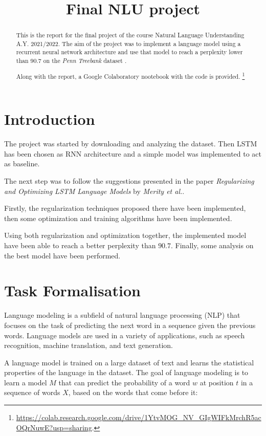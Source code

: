 \documentclass[a4paper]{article}
\title{Final NLU project}
\begin{document}
\maketitle

\begin{abstract}
This is the report for the final project of the course Natural Language Understanding A.Y. 2021/2022. The aim of the project
was to implement a language model using a recurrent neural network architecture and use that model to reach a perplexity lower 
than $90.7$ on the \textit{Penn Treebank} dataset \cite{PTB}.

Along with the report, a Google Colaboratory nootebook with the code is provided. \footnote{\url{https://colab.research.google.com/drive/1YtvMOG_NV_GIgWIFkMrchR5acOQrNuwE?usp=sharing}.}\\
\end{abstract}

\section{Introduction}
The project was started by downloading and analyzing the dataset. Then LSTM has been chosen as RNN architecture and
a simple model was implemented to act as baseline. 

The next step was to follow the suggestions presented in the paper \textit{Regularizing and Optimizing LSTM Language Models} \cite{Merity} 
by \textit{Merity et al.}.

Firstly, the regularization techniques proposed there have been implemented, then some optimization and training algorithms
have been implemented. 

Using both regularization and optimization together, the implemented model have been able to reach a better perplexity than $90.7$.
Finally, some analysis on the best model have been performed.

\section{Task Formalisation}
Language modeling is a subfield of natural language processing (NLP) that focuses on the task of predicting the 
next word in a sequence given the previous words. 
Language models are used in a variety of applications, such as speech recognition, machine translation, and text generation.

A language model is trained on a large dataset of text and learns the statistical properties of the language in the dataset. 
The goal of language modeling is to learn a model $M$ that can predict the probability of a word $w$ at position $t$ in a 
sequence of words $X$, based on the words that come before it:
\end{document}
